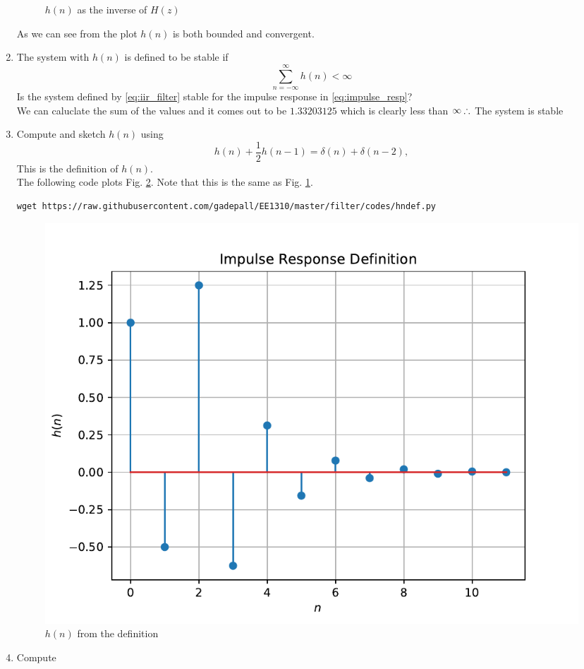 \documentclass[journal,12pt,twocolumn]{IEEEtran}
\renewcommand\thesection{\arabic{section}}
\begin{document}
\begin{enumerate}[label=\thesection.\arabic*]
\begin{figure}[!ht]
\caption{$h(n)$ as the inverse of $H(z)$}
\label{fig:hn}
\end{figure}
As we can see from the plot $h(n)$ is both bounded and convergent.
\item The system with $h(n)$ is defined to be stable if
\begin{equation}
\sum_{n=-\infty}^{\infty}h(n) < \infty
\end{equation}
Is the system defined by \eqref{eq:iir_filter} stable for the impulse response in \eqref{eq:impulse_resp}?\\
\solution We can caluclate the sum of the values and it comes out to be $1.33203125$ which is clearly less than $\infty\\ \therefore$ The system is stable
\item 
Compute and sketch $h(n)$ using 
\begin{equation}
\label{eq:iir_filter_h}
h(n) + \frac{1}{2}h(n-1) = \delta(n) + \delta(n-2), 
\end{equation}
%
This is the definition of $h(n)$.
\\
\solution The following code plots Fig. \ref{fig:hndef}. Note that this is the same as Fig. 
\ref{fig:hn}. 
%
\begin{lstlisting}
wget https://raw.githubusercontent.com/gadepall/EE1310/master/filter/codes/hndef.py
\end{lstlisting}
\begin{figure}[!ht]
\centering
\includegraphics[width=\columnwidth]{./figs/hndef}
\caption{$h(n)$ from the definition}
\label{fig:hndef}
\end{figure}
%
\item Compute 

\end{enumerate}
\end{document}
